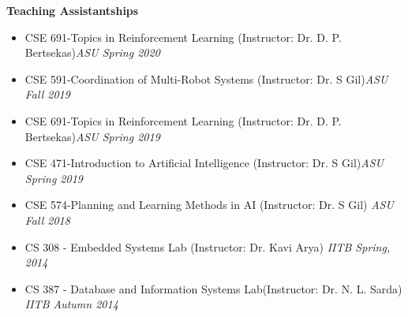 \documentclass[a4paper,11pt]{article}
\newcommand{\resheading}[1]{{\small \colorbox{mygrey}{\begin{minipage}{0.975\textwidth}{\textbf{#1 \vphantom{p\^{E}}}}\end{minipage}}}}
\begin{document}
	\resheading{\textbf{\large Teaching Assistantships}}
	\begin{description}
		\item
		\begin{itemize}
			\item CSE 691-Topics in Reinforcement Learning (Instructor: Dr. D. P. Bertsekas)\hfill\textit{ASU Spring 2020}
		\end{itemize}
		\item 
		\begin{itemize}
			\item CSE 591-Coordination of Multi-Robot Systems (Instructor: Dr. S Gil)\hfill  \textit{ASU Fall 2019}
		\end{itemize}
		\item 
		\begin{itemize}
			\item CSE 691-Topics in Reinforcement Learning (Instructor: Dr. D. P. Bertsekas)\hfill  \textit{ASU Spring 2019}
		\end{itemize}
		\item 
		\begin{itemize}
			\item CSE 471-Introduction to Artificial Intelligence (Instructor: Dr. S Gil)\hfill  \textit{ASU Spring 2019}
		\end{itemize}
		\item 
		\begin{itemize}
			\item CSE 574-Planning and Learning Methods in AI (Instructor: Dr. S Gil) \hfill \textit{ASU Fall 2018}
		\end{itemize}
		\item 
		\begin{itemize}
			\item CS 308 - Embedded Systems Lab (Instructor: Dr. Kavi Arya) \hfill \textit{IITB Spring, 2014}
		\end{itemize}
		\item 
		\begin{itemize}
			\item CS 387 - Database and Information Systems Lab(Instructor: Dr. N. L. Sarda) \hfill \textit{IITB Autumn 2014}
		\end{itemize}
		
	\end{description}
	
\end{document}

